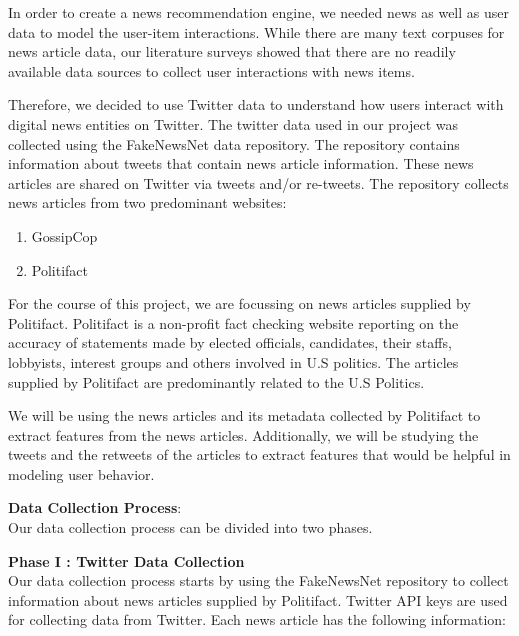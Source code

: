 \documentclass{article}
\begin{document}
In order to create a news recommendation engine, we needed news as well as user data to model the user-item interactions. While there are many text corpuses for news article data, our literature surveys showed that there are no readily available data sources to collect user interactions with news items. 

Therefore, we decided to use Twitter data to understand how users interact with digital news entities on Twitter. 
The twitter data used in our project was collected using the FakeNewsNet data repository. The repository contains information about tweets that contain news article information. These news articles are shared on Twitter via tweets and/or re-tweets. The repository collects news articles from two predominant websites:
\begin{enumerate}
\item GossipCop
\item Politifact
\end{enumerate}

For the course of this project, we are focussing on news articles supplied by Politifact. Politifact is a non-profit fact checking website reporting on the accuracy of statements made by elected officials, candidates, their staffs, lobbyists, interest groups and others involved in U.S politics. The articles supplied by Politifact are predominantly related to the U.S Politics. 

We will be using the news articles and its metadata collected by Politifact to extract features from the news articles. Additionally, we will be studying the tweets and the retweets of the articles to extract features that would be helpful in modeling user behavior. 

\textbf{Data Collection Process}:\\

Our data collection process can be divided into two phases.

\textbf{Phase I : Twitter Data Collection}\\
Our data collection process starts by using the FakeNewsNet repository to collect information about news articles supplied by Politifact. Twitter API keys are used for collecting data from Twitter.
Each news article has the following information:
\end{document}
